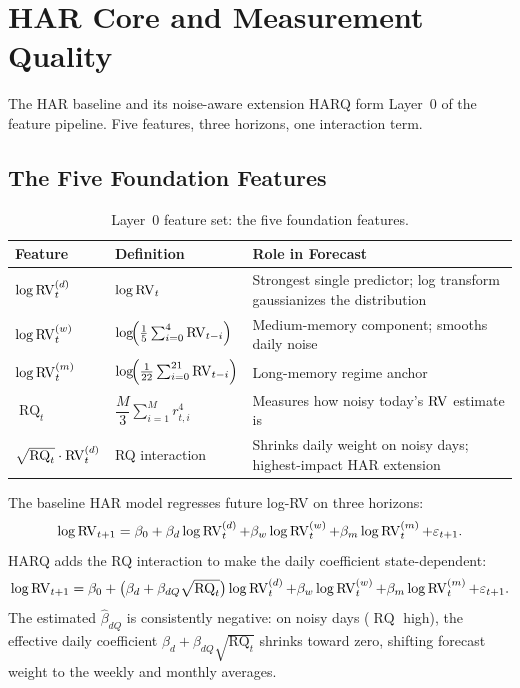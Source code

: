 \chapter{HAR Core and Measurement Quality}
\label{ch:har-core}

The HAR baseline and its noise-aware extension HARQ form Layer~0 of the feature pipeline.
Five features, three horizons, one interaction term.

\section{The Five Foundation Features}
\label{sec:foundation-features}

\begin{table}[htbp]
\centering
\caption{Layer~0 feature set: the five foundation features.}
\label{tab:foundation-features}
\small
\begin{tabular}{@{}lll@{}}
\toprule
\textbf{Feature} & \textbf{Definition} & \textbf{Role in Forecast} \\
\midrule
$\log \operatorname{RV}_t^{(d)}$ &
  $\log \operatorname{RV}_t$ &
  Strongest single predictor; log transform gaussianizes the distribution \\[8pt]
$\log \operatorname{RV}_t^{(w)}$ &
  $\log\!\Bigl(\tfrac{1}{5}\sum_{i=0}^{4} \operatorname{RV}_{t-i}\Bigr)$ &
  Medium-memory component; smooths daily noise \\[8pt]
$\log \operatorname{RV}_t^{(m)}$ &
  $\log\!\Bigl(\tfrac{1}{22}\sum_{i=0}^{21} \operatorname{RV}_{t-i}\Bigr)$ &
  Long-memory regime anchor \\[8pt]
$\operatorname{RQ}_t$ &
  $\dfrac{M}{3}\sum_{i=1}^{M} r_{t,i}^4$ &
  Measures how noisy today's $\operatorname{RV}$ estimate is \\[10pt]
$\sqrt{\operatorname{RQ}_t} \cdot \operatorname{RV}_t^{(d)}$ &
  RQ interaction &
  Shrinks daily weight on noisy days; highest-impact HAR extension \\
\bottomrule
\end{tabular}
\end{table}

The baseline HAR model \citep{Corsi2009} regresses future log-RV on three horizons:
\begin{equation}
\label{eq:har}
\log \operatorname{RV}_{t+1} = \beta_0
  + \beta_d \log \operatorname{RV}_t^{(d)}
  + \beta_w \log \operatorname{RV}_t^{(w)}
  + \beta_m \log \operatorname{RV}_t^{(m)}
  + \varepsilon_{t+1}.
\end{equation}
HARQ \citep{BPQ2016} adds the RQ interaction to make the daily coefficient state-dependent:
\begin{equation}
\label{eq:harq}
\log \operatorname{RV}_{t+1} = \beta_0
  + \bigl(\beta_d + \beta_{dQ}\sqrt{\operatorname{RQ}_t}\bigr)\log \operatorname{RV}_t^{(d)}
  + \beta_w \log \operatorname{RV}_t^{(w)}
  + \beta_m \log \operatorname{RV}_t^{(m)}
  + \varepsilon_{t+1}.
\end{equation}
The estimated $\hat{\beta}_{dQ}$ is consistently negative: on noisy days ($\operatorname{RQ}$ high), the effective daily coefficient $\beta_d + \beta_{dQ}\sqrt{\operatorname{RQ}_t}$ shrinks toward zero, shifting forecast weight to the weekly and monthly averages.



